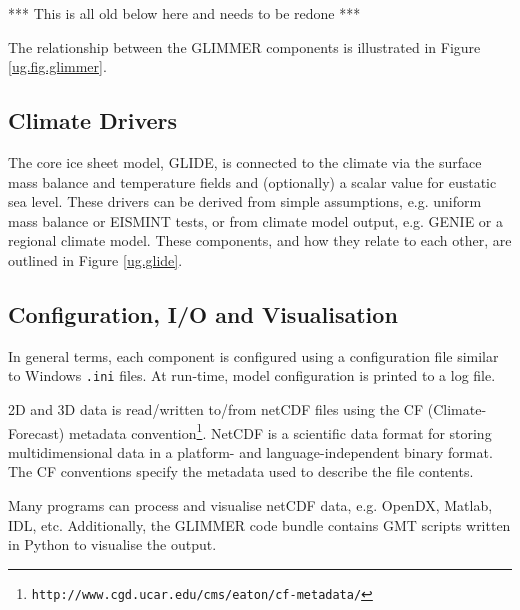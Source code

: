 \begin{itemize}
\end{itemize}
%
*** This is all old below here and needs to be redone ***

The relationship between the GLIMMER components is illustrated in Figure \ref{ug.fig.glimmer}. 
%
\subsection{Climate Drivers}
\label{subsec:climdrive}
The core ice sheet model, GLIDE, is connected to the climate via the surface mass balance and temperature fields and (optionally) a scalar value for eustatic sea level. These drivers can be derived from simple assumptions, e.g. uniform mass balance or EISMINT tests, or from climate model output, e.g. GENIE or a regional climate model. These components, and how they relate to each other, are outlined in Figure \ref{ug.glide}.
%
%
\subsection{Configuration, I/O and Visualisation}
In general terms, each component is configured using a configuration file similar to Windows \texttt{.ini} files. At run-time, model configuration is printed to a log file. 

2D and 3D data is read/written to/from netCDF files using the CF (Climate-Forecast) metadata convention\footnote{\texttt{http://www.cgd.ucar.edu/cms/eaton/cf-metadata/}}. NetCDF is a scientific data format for storing multidimensional data in a platform- and language-independent binary format. The CF conventions specify the metadata used to describe the file contents.

Many programs can process and visualise netCDF data, e.g. OpenDX, Matlab, IDL, etc. Additionally, the GLIMMER code bundle contains GMT scripts written in Python to visualise the output.
